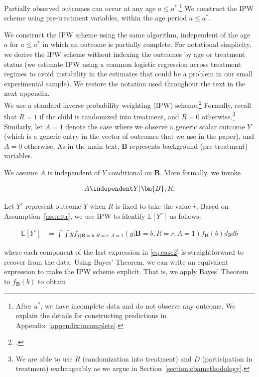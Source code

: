 \noindent Partially observed outcomes can occur at any age $a \leq a^*$.\footnote{After $a^*$, we have incomplete data and do not observe any outcome. We explain the details for constructing predictions in Appendix~\ref{appendix:incomplete}.} We construct the IPW scheme using pre-treatment variables, within the age period  $a \leq a^*$.

\noindent We construct the IPW scheme using the same algorithm, independent of the age $a$ for $a \leq a^*$ in which an outcome is partially complete. For notational simplicity, we derive the IPW scheme without indexing the outcomes by age or treatment status (we estimate IPW using a common logistic regression across treatment regimes to avoid instability in the estimates that could be a problem in our small experimental sample). We restore the notation used throughout the text in the next appendix. \\

\noindent We use a standard inverse probability weighting (IPW) scheme.\footnote{\citet{Horvitz_Thompson_1952_JASA}.} Formally, recall that $R = 1$ if the child is randomized into treatment, and $R = 0$ otherwise.\footnote{We are able to use $R$ (randomization into treatment) and $D$ (participation in treatment) exchangeably as we argue in Section~\ref{section:cbamethodology}.} Similarly, let $A = 1$ denote the case where we observe a generic scalar outcome $Y$ (which is a generic entry in the vector of outcomes that we use in the paper), and $A = 0$ otherwise. As in the main text, $\bm{B}$ represents background (pre-treatment) variables.

\noindent We assume $A$ is independent of $Y$ conditional on $\bm{B}$. More formally, we invoke

\begin{assumption} \label{ass:attr}
	\begin{align*}
		A \independent Y | \bm{B}, R.
	\end{align*}
\end{assumption}

\noindent Let $Y^{r}$ represent outcome $Y$ when $R$ is fixed to take the value $r$. Based on Assumption~\ref{ass:attr}, we use IPW to identify $\mathbb{E}[Y^r]$ as follows:

\begin{align} \label{eq:case2}
\mathbb{E}[Y^r] &= \int \int y f_{Y|\bm{B} = b,R=r, A=1} (y | \bm{B} = b,R=r, A=1) f_{\bm{B}} (b) dydb
\end{align}

\noindent where each component of the last expression in \eqref{eq:case2} is straightforward to recover from the data. Using Bayes' Theorem, we can write an equivalent expression to make the IPW scheme explicit. That is, we apply Bayes' Theorem to $f_{\bm{B}} (b)$ to obtain


